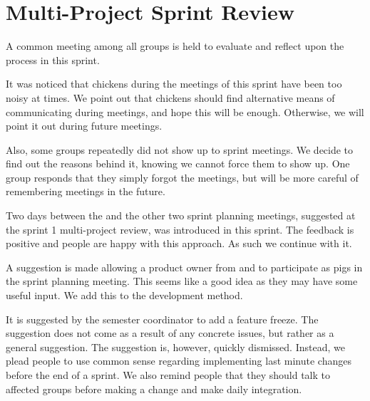 \section{Multi-Project Sprint Review}\label{sec:s2_multiprj_review}
A common meeting among all groups is held to evaluate and reflect upon the process in this sprint.

It was noticed that chickens during the meetings of this sprint have been too noisy at times. We point out that chickens should find alternative means of communicating during meetings, and hope this will be enough. Otherwise, we will point it out during future meetings.

Also, some groups repeatedly did not show up to sprint meetings. We decide to find out the reasons behind it, knowing we cannot force them to show up. One group responds that they simply forgot the meetings, but will be more careful of remembering meetings in the future.

Two days between the \gui and the other two sprint planning meetings, suggested at the sprint 1 multi-project review, was introduced in this sprint. The feedback is positive and people are happy with this approach. As such we continue with it.

A suggestion is made allowing a product owner from \db and \bd to participate as pigs in the \gui sprint planning meeting. This seems like a good idea as they may have some useful input. We add this to the development method.

It is suggested by the semester coordinator to add a feature freeze. The suggestion does not come as a result of any concrete issues, but rather as a general suggestion. The suggestion is, however, quickly dismissed. Instead, we plead people to use common sense regarding implementing last minute changes before the end of a sprint. We also remind people that they should talk to affected groups before making a change and make daily integration.
